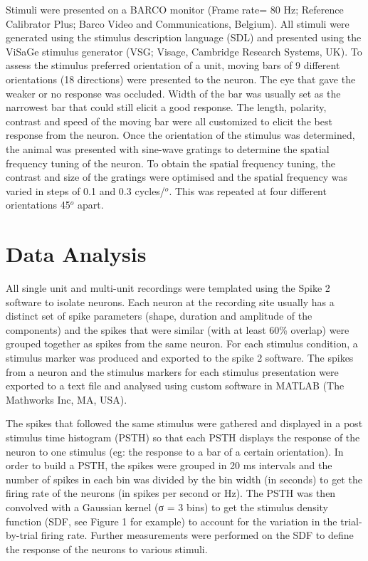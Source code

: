 	Stimuli were presented on a BARCO monitor (Frame rate= 80 Hz; Reference Calibrator Plus; Barco Video and Communications, Belgium). All stimuli were generated using the stimulus description language (SDL) and presented using the ViSaGe stimulus generator (VSG; Visage, Cambridge Research Systems, UK). To assess the stimulus preferred orientation of a unit, moving bars of 9 different orientations (18 directions) were presented to the neuron. The eye that gave the weaker or no response was occluded. Width of the bar was usually set as the narrowest bar that could still elicit a good response. The length, polarity, contrast and speed of the moving bar were all customized to elicit the best response from the neuron. Once the orientation of the stimulus was determined, the animal was presented with sine-wave gratings to determine the spatial frequency tuning of the neuron. To obtain the spatial frequency tuning, the contrast and size of the gratings were optimised and the spatial frequency was varied in steps of 0.1 and 0.3 cycles/$^o$. This was repeated at four different orientations 45$^o$ apart.
	
	\section{Data Analysis}
	
	All single unit and multi-unit recordings were templated using the Spike 2 software to isolate neurons. Each neuron at the recording site usually has a distinct set of spike parameters (shape, duration and amplitude of the components) and the spikes that were similar (with at least 60\% overlap) were grouped together as spikes from the same neuron. For each stimulus condition, a stimulus marker was produced and exported to the spike 2 software. The spikes from a neuron and the stimulus markers for each stimulus presentation were exported to a text file and analysed using custom software in MATLAB (The Mathworks Inc, MA, USA).
	
	The spikes that followed the same stimulus were gathered and displayed in a post stimulus time histogram (PSTH) so that each PSTH displays the response of the neuron to one stimulus (eg: the response to a bar of a certain orientation). In order to build a PSTH, the spikes were grouped in 20 ms intervals and the number of spikes in each bin was divided by the bin width (in seconds) to get the firing rate of the neurons (in spikes per second or Hz). The PSTH was then convolved with a Gaussian kernel (σ = 3 bins) to get the stimulus density function (SDF, see Figure 1 for example) to account for the variation in the trial-by-trial firing rate. Further measurements were performed on the SDF to define the response of the neurons to various stimuli.
	
